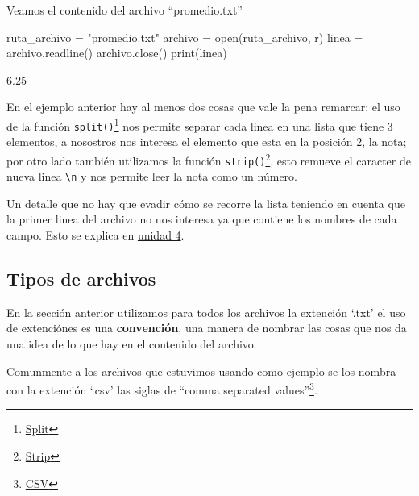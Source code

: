 \documentclass[
  letterpaper,
  DIV=11,
  numbers=noendperiod]{scrreprt}
\newenvironment{Shaded}{\begin{snugshade}}{\end{snugshade}}
\newcommand{\BuiltInTok}[1]{\textcolor[rgb]{0.00,0.23,0.31}{#1}}
\newcommand{\ExtensionTok}[1]{\textcolor[rgb]{0.00,0.23,0.31}{#1}}
\newcommand{\NormalTok}[1]{\textcolor[rgb]{0.00,0.23,0.31}{#1}}
\newcommand{\OperatorTok}[1]{\textcolor[rgb]{0.37,0.37,0.37}{#1}}
\newcommand{\StringTok}[1]{\textcolor[rgb]{0.13,0.47,0.30}{#1}}
\begin{document}
Veamos el contenido del archivo ``promedio.txt''

\begin{Shaded}
\begin{Highlighting}[]
\NormalTok{ruta\_archivo }\OperatorTok{=} \StringTok{"promedio.txt"}
\NormalTok{archivo }\OperatorTok{=} \BuiltInTok{open}\NormalTok{(ruta\_archivo, }\StringTok{\textquotesingle{}r\textquotesingle{}}\NormalTok{)}
\NormalTok{linea }\OperatorTok{=}\NormalTok{ archivo.readline()}
\NormalTok{archivo.close()}
\BuiltInTok{print}\NormalTok{(linea)}
\end{Highlighting}
\end{Shaded}

\begin{Shaded}
\begin{Highlighting}[]
\ExtensionTok{6.25}
\end{Highlighting}
\end{Shaded}

En el ejemplo anterior hay al menos dos cosas que vale la pena remarcar:
el uso de la función \texttt{split()}\footnote{\href{https://docs.python.org/es/3/library/stdtypes.html\#str.split}{Split}}
nos permite separar cada linea en una lista que tiene 3 elementos, a
nosostros nos interesa el elemento que esta en la posición 2, la nota;
por otro lado también utilizamos la función \texttt{strip()}\footnote{\href{https://docs.python.org/es/3/library/stdtypes.html\#str.strip}{Strip}},
esto remueve el caracter de nueva linea \texttt{\textbackslash{}n} y nos
permite leer la nota como un número.

Un detalle que no hay que evadir cómo se recorre la lista teniendo en
cuenta que la primer linea del archivo no nos interesa ya que contiene
los nombres de cada campo. Esto se explica en
\hyperref[listas-como-secuencias]{unidad 4}.

\subsection{Tipos de archivos}\label{tipos-de-archivos}

En la sección anterior utilizamos para todos los archivos la extención
`.txt' el uso de extenciónes es una \textbf{convención}, una manera de
nombrar las cosas que nos da una idea de lo que hay en el contenido del
archivo.

Comunmente a los archivos que estuvimos usando como ejemplo se los
nombra con la extención `.csv' las siglas de ``comma separated
values''\footnote{\href{https://es.wikipedia.org/wiki/Valores_separados_por_comas}{CSV}}.
\end{document}
